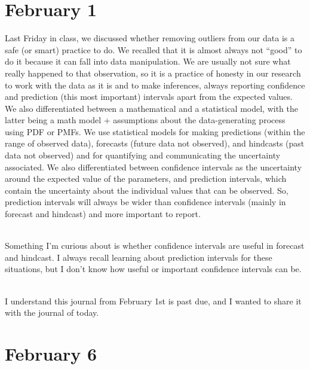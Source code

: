 \documentclass[
]{book}
\begin{document}
\hypertarget{february-1}{%
\section{February 1}\label{february-1}}

Last Friday in class, we discussed whether removing outliers from our data is a safe (or smart) practice to do. We recalled that it is almost always not ``good'' to do it because it can fall into data manipulation. We are usually not sure what really happened to that observation, so it is a practice of honesty in our research to work with the data as it is and to make inferences, always reporting confidence and prediction (this most important) intervals apart from the expected values. We also differentiated between a mathematical and a statistical model, with the latter being a math model + assumptions about the data-generating process using PDF or PMFs. We use statistical models for making predictions (within the range of observed data), forecasts (future data not observed), and hindcasts (past data not observed) and for quantifying and communicating the uncertainty associated. We also differentiated between confidence intervals as the uncertainty around the expected value of the parameters, and prediction intervals, which contain the uncertainty about the individual values that can be observed. So, prediction intervals will always be wider than confidence intervals (mainly in forecast and hindcast) and more important to report.\\
\strut \\
Something I'm curious about is whether confidence intervals are useful in forecast and hindcast. I always recall learning about prediction intervals for these situations, but I don't know how useful or important confidence intervals can be.\\
\strut \\
I understand this journal from February 1st is past due, and I wanted to share it with the journal of today.

\hypertarget{february-6}{%
\section{February 6}\label{february-6}}
\end{document}
